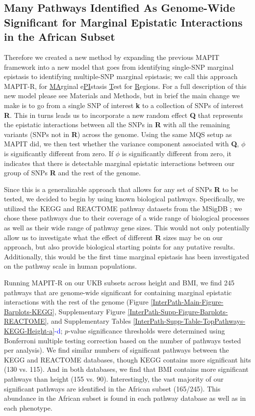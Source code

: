 \documentclass[12pt,a4paper]{article}
\begin{document}
\subsection{Many Pathways Identified As Genome-Wide Significant for Marginal Epistatic Interactions in the African Subset}\label{InterPath-Results-PathwayEpistasis}

Therefore we created a new method by expanding the previous MAPIT framework into a new model that goes from identifying single-SNP marginal epistasis to identifying multiple-SNP marginal epistasis; we call this approach MAPIT-R, for \underline{MA}rginal e\underline{PI}stasis \underline{T}est for \underline{R}egions. For a full description of this new model please see Materials and Methods, but in brief the main change we make is to go from a single SNP of interest \textbf{k} to a collection of SNPs of interest \textbf{R}. This in turns leads us to incorporate a new random effect  \textbf{Q} that represents the epistatic interactions between all the SNPs in \textbf{R} with all the remaining variants (SNPs not in \textbf{R}) across the genome. Using the same MQS \citep{Zhou2017} setup as MAPIT did, we then test whether the variance component associated with \textbf{Q}, $\phi$ is significantly different from zero. If $\phi$ is significantly different from zero, it indicates that there is detectable marginal epistatic interactions between our group of SNPs \textbf{R} and the rest of the genome.

Since this is a generalizable approach that allows for any set of SNPs \textbf{R} to be tested, we decided to begin by using known biological pathways. Specifically, we utilized the KEGG and REACTOME pathway datasets from the MSigDB \citep{Liberzon2011}; we chose these pathways due to their coverage of a wide range of biological processes as well as their wide range of pathway gene sizes. This would not only potentially allow us to investigate what the effect of different \textbf{R} sizes may be on our approach, but also provide biological starting points for any putative results. Additionally, this would be the first time marginal epistasis has been investigated on the pathway scale in human populations.

Running MAPIT-R on our UKB subsets across height and BMI, we find 245 pathways that are genome-wide significant for containing marginal epistatic interactions with the rest of the genome (Figure \ref{InterPath-Main-Figure-Barplots-KEGG}, Supplementary Figure \ref{InterPath-Supp-Figure-Barplots-REACTOME}, and Supplementary Tables \ref{InterPath-Supp-Table-TopPathways-KEGG-Height-a}\textcolor{blue}{-d}; $p$-value significance thresholds were determined using Bonferroni multiple testing correction based on the number of pathways tested per analysis). We find similar numbers of significant pathways between the KEGG and REACTOME databases, though KEGG contains more significant hits (130 vs. 115). And in both databases, we find that BMI contains more significant pathways than height (155 vs. 90). Interestingly, the vast majority of our significant pathways are identified in the African subset (165/245). This abundance in the African subset is found in each pathway database as well as in each phenotype.   
\end{document}
